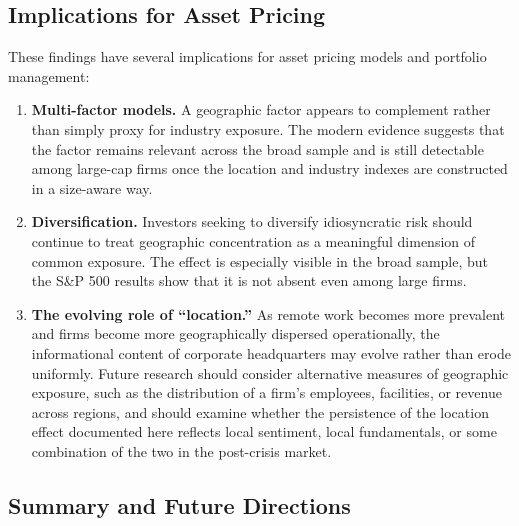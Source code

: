 \documentclass[
  12pt,
]{article}
\begin{document}
\subsection{Implications for Asset
Pricing}\label{implications-for-asset-pricing}

These findings have several implications for asset pricing models and
portfolio management:

\begin{enumerate}
\def\labelenumi{\arabic{enumi}.}
\item
  \textbf{Multi-factor models.} A geographic factor appears to
  complement rather than simply proxy for industry exposure. The modern
  evidence suggests that the factor remains relevant across the broad
  sample and is still detectable among large-cap firms once the location
  and industry indexes are constructed in a size-aware way.
\item
  \textbf{Diversification.} Investors seeking to diversify idiosyncratic
  risk should continue to treat geographic concentration as a meaningful
  dimension of common exposure. The effect is especially visible in the
  broad sample, but the S\&P 500 results show that it is not absent even
  among large firms.
\item
  \textbf{The evolving role of ``location.''} As remote work becomes
  more prevalent and firms become more geographically dispersed
  operationally, the informational content of corporate headquarters may
  evolve rather than erode uniformly. Future research should consider
  alternative measures of geographic exposure, such as the distribution
  of a firm's employees, facilities, or revenue across regions, and
  should examine whether the persistence of the location effect
  documented here reflects local sentiment, local fundamentals, or some
  combination of the two in the post-crisis market.
\end{enumerate}

\subsection{Summary and Future
Directions}\label{summary-and-future-directions}
\end{document}
